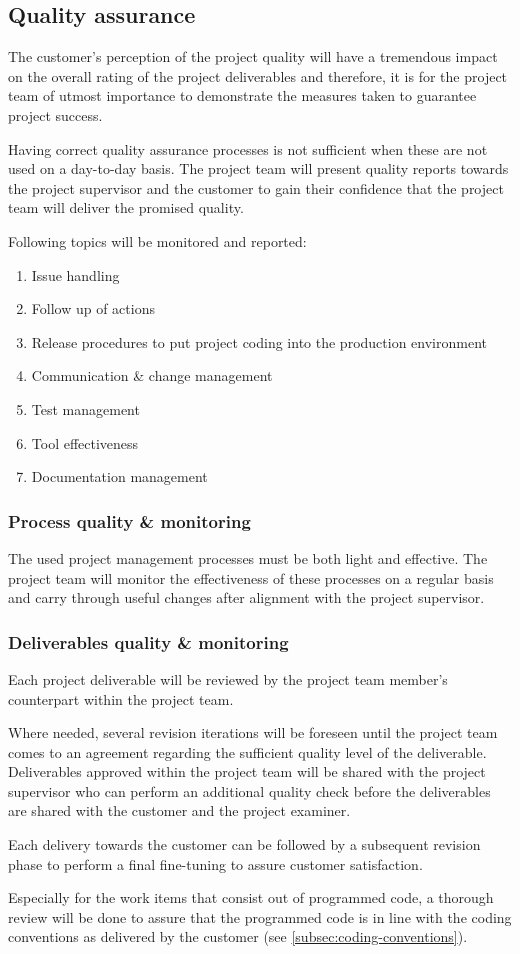 \subsection{Quality assurance}
The customer's perception of the project quality will have a tremendous impact on the overall rating of the project deliverables and therefore, it is for the project team of utmost importance to demonstrate the measures taken to guarantee project success.

Having correct quality assurance processes is not sufficient when these are not used on a day-to-day basis.
The project team will present quality reports towards the project supervisor and the customer to gain their confidence that the project team will deliver the promised quality.

Following topics will be monitored and reported: 
\begin{enumerate}
	\item Issue handling
	\item Follow up of actions
	\item Release procedures to put project coding into the production environment
	\item Communication \& change management
	\item Test management
	\item Tool effectiveness
	\item Documentation management
\end {enumerate}

\subsubsection{Process quality \& monitoring}
The used project management processes must be both light and effective.
The project team will monitor the effectiveness of these processes on a regular basis and carry through useful changes after alignment with the project supervisor.

\subsubsection{Deliverables quality \& monitoring}
Each project deliverable will be reviewed by the project team member's counterpart within the project team.

Where needed, several revision iterations will be foreseen until the project team comes to an agreement regarding the sufficient quality level of the deliverable.
Deliverables approved within the project team will be shared with the project supervisor who can perform an additional quality check before the deliverables are shared with the customer and the project examiner.

Each delivery towards the customer can be followed by a subsequent revision phase to perform a final fine-tuning to assure customer satisfaction.

Especially for the work items that consist out of programmed code, a thorough review will be done to assure that the programmed code is in line with the coding conventions as delivered by the customer (see \autoref{subsec:coding-conventions}).
